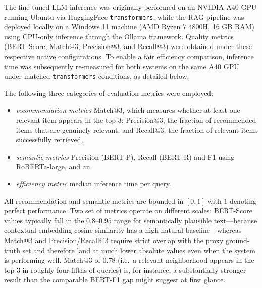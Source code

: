 \documentclass[pdflatex,sn-mathphys-num]{sn-jnl}%
\theoremstyle{thmstyleone}%
\theoremstyle{thmstyletwo}%
\theoremstyle{thmstylethree}%
\begin{document}
The fine-tuned LLM inference was originally performed on an NVIDIA A40 GPU running Ubuntu via HuggingFace \texttt{transformers}, while the RAG pipeline was deployed locally on a Windows 11 machine (AMD Ryzen 7 4800H, 16 GB RAM) using CPU-only inference through the Ollama framework. Quality metrics (BERT-Score, Match@3, Precision@3, and Recall@3) were obtained under these respective native configurations. To enable a fair efficiency comparison, inference time was subsequently re-measured for both systems on the same A40 GPU under matched \texttt{transformers} conditions, as detailed below.


The following three categories of evaluation metrics were employed: 
\begin{itemize}
    \item \emph{recommendation metrics} Match@3, which measures whether at least one relevant item appears in the top-3; Precision@3, the fraction of recommended items that are genuinely relevant; and Recall@3, the fraction of relevant items successfully retrieved,
    \item  \emph{semantic metrics} Precision (BERT-P), Recall (BERT-R) and F1 using RoBERTa-large, and an
    \item \emph{efficiency metric} median inference time per query. 
\end{itemize}
 All recommendation and semantic metrics are bounded in $[0, 1]$ with $1$ denoting perfect performance. Two set of metrics operate on different scales: BERT-Score values typically fall in the $0.8$--$0.95$ range for semantically plausible text---because contextual-embedding cosine similarity has a high natural baseline---whereas Match@3 and Precision/Recall@3 require strict overlap with the proxy ground-truth set and therefore land at much lower absolute values even when the system is performing well. Match@3 of $0.78$ (i.e.\ a relevant neighborhood appears in the top-3 in roughly four-fifths of queries) is, for instance, a substantially stronger result than the comparable BERT-F1 gap might suggest at first glance.

\end{document}
